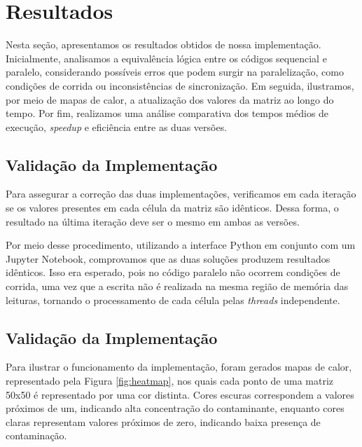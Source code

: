 \documentclass[12pt]{article}
\begin{document}
\section{Resultados}

Nesta seção, apresentamos os resultados obtidos de nossa implementação. Inicialmente, analisamos a equivalência lógica entre os códigos sequencial e paralelo, considerando possíveis erros que podem surgir na paralelização, como condições de corrida ou inconsistências de sincronização. Em seguida, ilustramos, por meio de mapas de calor, a atualização dos valores da matriz ao longo do tempo. Por fim, realizamos uma análise comparativa dos tempos médios de execução, \textit{speedup} e eficiência entre as duas versões.

\subsection{Validação da Implementação}

Para assegurar a correção das duas implementações, verificamos em cada iteração se os valores presentes em cada célula da matriz são idênticos. Dessa forma, o resultado na última iteração deve ser o mesmo em ambas as versões.

Por meio desse procedimento, utilizando a interface Python em conjunto com um Jupyter Notebook, comprovamos que as duas soluções produzem resultados idênticos. Isso era esperado, pois no código paralelo não ocorrem condições de corrida, uma vez que a escrita não é realizada na mesma região de memória das leituras, tornando o processamento de cada célula pelas \textit{threads} independente.

\subsection{Validação da Implementação}

Para ilustrar o funcionamento da implementação, foram gerados mapas de calor, representado pela Figura \ref{fig:heatmap}, nos quais cada ponto de uma matriz 50x50 é representado por uma cor distinta. Cores escuras correspondem a valores próximos de um, indicando alta concentração do contaminante, enquanto cores claras representam valores próximos de zero, indicando baixa presença de contaminação.
\end{document}

